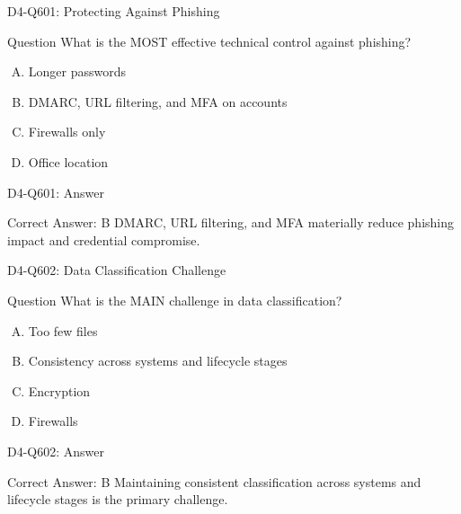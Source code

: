 \documentclass{beamer}
\begin{document}
	\begin{frame}{D4-Q601: Protecting Against Phishing}
		\begin{block}{Question}
			What is the MOST effective technical control against phishing?
		\end{block}
		\begin{enumerate}[(A)]
			\item Longer passwords
			\item DMARC, URL filtering, and MFA on accounts
			\item Firewalls only
			\item Office location
		\end{enumerate}
	\end{frame}
	\begin{frame}{D4-Q601: Answer}
		\begin{block}{Correct Answer: B}
			DMARC, URL filtering, and MFA materially reduce phishing impact and credential compromise.
		\end{block}
	\end{frame}
	
	\begin{frame}{D4-Q602: Data Classification Challenge}
		\begin{block}{Question}
			What is the MAIN challenge in data classification?
		\end{block}
		\begin{enumerate}[(A)]
			\item Too few files
			\item Consistency across systems and lifecycle stages
			\item Encryption
			\item Firewalls
		\end{enumerate}
	\end{frame}
	\begin{frame}{D4-Q602: Answer}
		\begin{block}{Correct Answer: B}
			Maintaining consistent classification across systems and lifecycle stages is the primary challenge.
		\end{block}
	\end{frame}
	
\end{document}
